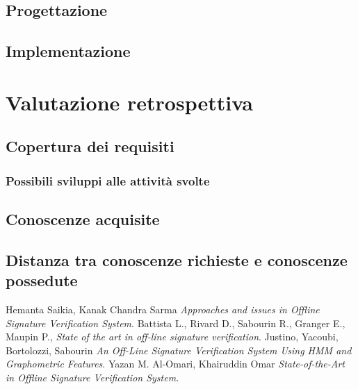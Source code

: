 \subsection{Progettazione}
\label{3.3}

\subsection{Implementazione}
\label{3.4}
\newpage

\section{Valutazione retrospettiva}
\label{4.0}

\subsection{Copertura dei requisiti}
\label{4.1}

\subsubsection{Possibili sviluppi alle attività svolte}
\subsection{Conoscenze acquisite}

\label{4.2}
\subsection{Distanza tra conoscenze richieste e conoscenze possedute}

\label{4.3}
\newpage

\printglossaries
{}
\label{5.0}

\newpage
\begin{thebibliography}{1}
 Hemanta Saikia, Kanak Chandra Sarma {\em Approaches and issues in Offline Signature Verification System}.
 Battista L., Rivard D., Sabourin R., Granger E., Maupin P., {\em State of the art in off-line signature verification}.
 Justino, Yacoubi, Bortolozzi, Sabourin {\em An Off-Line Signature Verification System Using HMM and Graphometric Features}.
 Yazan M. Al-Omari, Khairuddin Omar {\em State-of-the-Art in Offline Signature Verification System}.
\end{thebibliography}
\label{6.0}

\newpage






